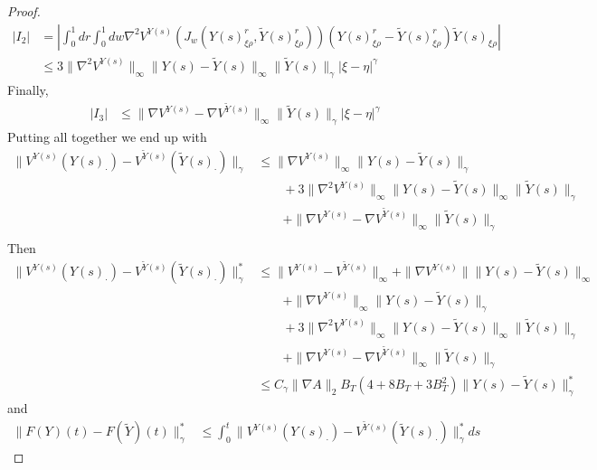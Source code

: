 \documentclass[a4paper,12pt,reqno]{amsart}
\newcommand{\wt}{\widetilde}
\newcommand{\norm}[1]{\|#1\|}
\begin{document}
\begin{proof}
\begin{equation*}
  \begin{split}
 |I_2| & = \left|
 \int_0^1 dr  \int_0^1 dw \nabla^2
   V^{Y(s)}(J_w(Y(s)^r_{\xi\rho},\wt Y(s)^r_{\xi\rho}))  (Y(s)^r_{\xi\rho}-\wt Y(s)^r_{\xi\rho})
 \wt Y(s)_{\xi\rho}
\right|
\\ &
\le 3\norm{\nabla^2 V^{Y(s)}}_\infty \norm{Y(s)-\wt Y(s)}_\infty
  \norm{\wt Y(s)}_\gamma
  |\xi-\eta|^\gamma
  \end{split}
\end{equation*}
Finally,
\begin{equation*}
  \begin{split}
|I_3| & \le   \norm{\nabla V^{Y(s)}-\nabla V^{\wt Y(s)}}_\infty \norm{\wt
 Y(s)}_\gamma |\xi-\eta|^\gamma
  \end{split}
\end{equation*}
Putting all together we end up with
\begin{equation*}
  \begin{split}
 \|V^{Y(s)}(Y(s)_\cdot) - V^{\wt Y(s)}(\wt Y(s)_\cdot)\|_{\gamma}
& \le
\norm{\nabla V^{Y(s)}}_\infty \norm{Y(s)-\wt Y(s)}_\gamma
\\ & \qquad +3\norm{\nabla^2 V^{Y(s)}}_\infty \norm{Y(s)-\wt Y(s)}_\infty
  \norm{\wt Y(s)}_\gamma
\\ & \qquad+\norm{\nabla V^{Y(s)}-\nabla V^{\wt Y(s)}}_\infty \norm{\wt
 Y(s)}_\gamma
 \\ &
  \end{split}
\end{equation*}
Then
\begin{equation*}
  \begin{split}
\|V^{Y(s)}(Y(s)_\cdot) - V^{\wt Y(s)}(\wt Y(s)_\cdot)\|^*_{\gamma} & \le
\| V^{Y(s)} - V^{\wt Y(s)}\|_\infty + \|\nabla V^{ Y(s)}\|
  \|Y(s)-\wt Y(s)\|_{\infty}
\\ & \qquad +\norm{\nabla V^{Y(s)}}_\infty \norm{Y(s)-\wt Y(s)}_\gamma
\\ & \qquad +3\norm{\nabla^2 V^{Y(s)}}_\infty \norm{Y(s)-\wt Y(s)}_\infty
  \norm{\wt Y(s)}_\gamma
\\ & \qquad+\norm{\nabla V^{Y(s)}-\nabla V^{\wt Y(s)}}_\infty \norm{\wt
 Y(s)}_\gamma
\\&
 \le
C_\gamma \norm{\nabla A}_2 B_T(4 + 8 B_T + 3 B_T^2) \norm{Y(s)-\wt
 Y(s)}_\gamma^*
     \end{split}
\end{equation*}
and
\begin{equation*}
  \begin{split}
\|F(Y)(t)-F(\wt Y)(t)\|^*_{\gamma} &
 \le \int_0^t  \|V^{Y(s)}(Y(s)_\cdot) - V^{\wt Y(s)}(\wt Y(s)_\cdot)\|^*_{\gamma} ds
  \end{split}
\end{equation*}


\end{proof}
\end{document}

